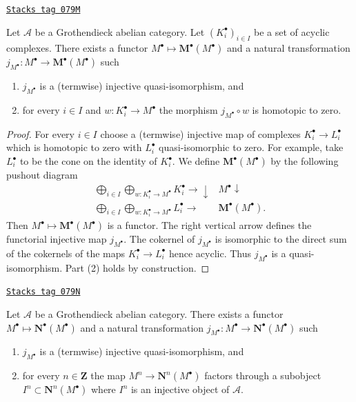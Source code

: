 \begin{lemma}
\label{injectives-lemma-functorial-homotopies}
\href{https://stacks.math.columbia.edu/tag/079M}{\texttt{Stacks tag 079M}}

Let $\mathcal{A}$ be a Grothendieck abelian category.
Let $(K_i^\bullet)_{i \in I}$ be a set of acyclic complexes.
There exists a functor $M^\bullet \mapsto \mathbf{M}^\bullet(M^\bullet)$
and a natural transformation
$j_{M^\bullet} : M^\bullet \to \mathbf{M}^\bullet(M^\bullet)$
such
\begin{enumerate}
\item $j_{M^\bullet}$ is a (termwise) injective quasi-isomorphism, and
\item for every $i \in I$ and $w : K_i^\bullet \to M^\bullet$
the morphism $j_{M^\bullet} \circ w$ is homotopic to zero.
\end{enumerate}
\end{lemma}

\begin{proof}
For every $i \in I$ choose a (termwise) injective map of complexes
$K_i^\bullet \to L_i^\bullet$ which is homotopic to zero with
$L_i^\bullet$ quasi-isomorphic to zero. For example, take $L_i^\bullet$
to be the cone on the identity of $K_i^\bullet$.
We define $\mathbf{M}^\bullet(M^\bullet)$ by the following pushout diagram
$$
\begin{array}{cc}\bigoplus_{i \in I}
\bigoplus_{w : K_i^\bullet \to M^\bullet}
K_i^\bullet \longrightarrow\downarrow & M^\bullet \downarrow \\ \bigoplus_{i \in I}
\bigoplus_{w : K_i^\bullet \to M^\bullet}
L_i^\bullet \longrightarrow & \mathbf{M}^\bullet(M^\bullet).\end{array}
$$
Then $M^\bullet \mapsto \mathbf{M}^\bullet(M^\bullet)$ is a functor. The right
vertical arrow defines the functorial injective map $j_{M^\bullet}$.
The cokernel of $j_{M^\bullet}$ is isomorphic to the direct sum of
the cokernels of the maps $K_i^\bullet \to L_i^\bullet$ hence acyclic.
Thus $j_{M^\bullet}$ is a quasi-isomorphism. Part (2) holds by construction.
\end{proof}

\begin{lemma}
\label{injectives-lemma-functorial-injective}
\href{https://stacks.math.columbia.edu/tag/079N}{\texttt{Stacks tag 079N}}

Let $\mathcal{A}$ be a Grothendieck abelian category.
There exists a functor $M^\bullet \mapsto \mathbf{N}^\bullet(M^\bullet)$
and a natural transformation
$j_{M^\bullet} : M^\bullet \to \mathbf{N}^\bullet(M^\bullet)$
such
\begin{enumerate}
\item $j_{M^\bullet}$ is a (termwise) injective quasi-isomorphism, and
\item for every $n \in \mathbf{Z}$ the map $M^n \to \mathbf{N}^n(M^\bullet)$
factors through a subobject $I^n \subset \mathbf{N}^n(M^\bullet)$ where $I^n$
is an injective object of $\mathcal{A}$.
\end{enumerate}
\end{lemma}

